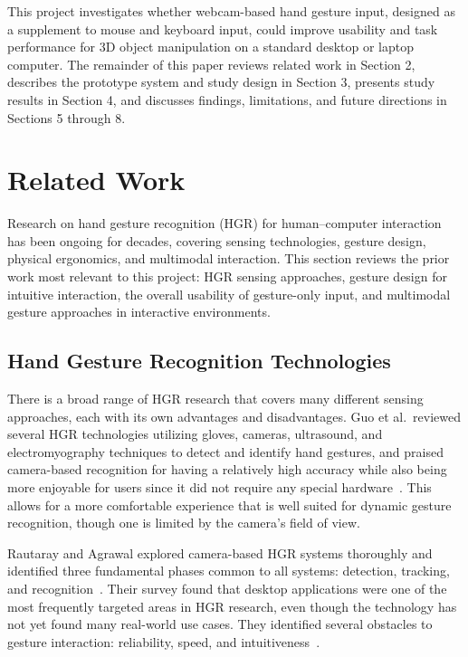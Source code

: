\documentclass[manuscript]{acmart}
\begin{document}
This project investigates whether webcam-based hand gesture input, designed as a supplement to mouse and keyboard input, could improve usability and task performance for 3D object manipulation on a standard desktop or laptop computer. The remainder of this paper reviews related work in Section 2, describes the prototype system and study design in Section 3, presents study results in Section 4, and discusses findings, limitations, and future directions in Sections 5 through 8.

\section{Related Work}

Research on hand gesture recognition (HGR) for human–computer interaction has been ongoing for decades, covering sensing technologies, gesture design, physical ergonomics, and multimodal interaction. This section reviews the prior work most relevant to this project: HGR sensing approaches, gesture design for intuitive interaction, the overall usability of gesture-only input, and multimodal gesture approaches in interactive environments.

\subsection{Hand Gesture Recognition Technologies}

There is a broad range of HGR research that covers many different sensing approaches, each with its own advantages and disadvantages. Guo et al.\ reviewed several HGR technologies utilizing gloves, cameras, ultrasound, and electromyography techniques to detect and identify hand gestures, and praised camera-based recognition for having a relatively high accuracy while also being more enjoyable for users since it did not require any special hardware~\cite{guo2021}. This allows for a more comfortable experience that is well suited for dynamic gesture recognition, though one is limited by the camera's field of view.

Rautaray and Agrawal explored camera-based HGR systems thoroughly and identified three fundamental phases common to all systems: detection, tracking, and recognition~\cite{rautaray2015}. Their survey found that desktop applications were one of the most frequently targeted areas in HGR research, even though the technology has not yet found many real-world use cases. They identified several obstacles to gesture interaction: reliability, speed, and intuitiveness~\cite{rautaray2015}.
\end{document}
